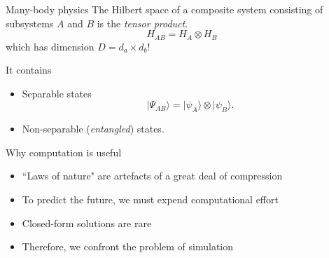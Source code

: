 \documentclass[10pt]{beamer}
\begin{document}
\begin{frame}{Many-body physics}
The Hilbert space of a composite system consisting of subsystems $A$ and $B$ is the \emph{tensor product}.
$$ H_{AB} = H_A\otimes H_B$$
which has dimension $D = d_a \times d_b$!

It contains
\begin{itemize}
    \item Separable states $$ |\Psi_{AB} \rangle =  |\psi_{A}\rangle \otimes |\psi_{B}\rangle. $$
    \item Non-separable (\emph{entangled}) states.
\end{itemize}


\end{frame}


\begin{frame}{Why computation is useful}
\begin{itemize}
    \item ``Laws of nature" are artefacts of a great deal of compression
    \item To predict the future, we must expend computational effort
    \item Closed-form solutions are rare
    \item Therefore, we confront the problem of simulation
\end{itemize}
\end{frame}
\end{document}
